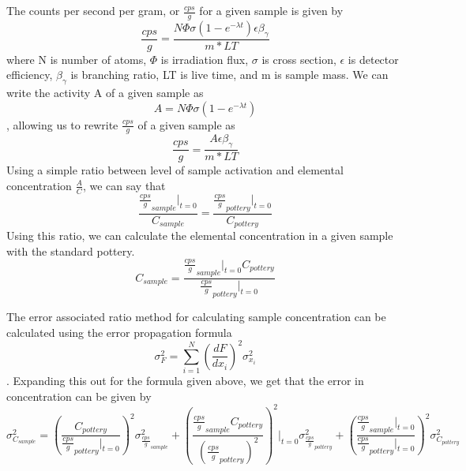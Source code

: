 \documentclass[]{article}
\begin{document}
The counts per second per gram, or $\frac{cps}{g}$ for a given sample is given by $$\frac{cps}{g} = \frac{N\Phi\sigma(1-e^{-\lambda t})\epsilon \beta_{ \gamma}}{m * LT}$$ where N is number of atoms, $\Phi$ is irradiation flux, $\sigma$ is cross section, $\epsilon$ is detector efficiency, $\beta_{\gamma}$ is branching ratio, LT is live time, and m is sample mass. We can write the activity A of a given sample as $$A=N\Phi\sigma(1-e^{-\lambda t})$$, allowing us to rewrite $\frac{cps}{g}$ of a given sample as $$\frac{cps}{g} = \frac{A\epsilon\beta_{\gamma}}{m*LT}$$ Using a simple ratio between level of sample activation and elemental concentration $\frac{A}{C}$, we can say that $$\frac{\frac{cps}{g}_{sample}|_{t=0}}{C_{sample}} = \frac{\frac{cps}{g}_{pottery}|_{t=0}}{C_{pottery}}$$ Using this ratio, we can calculate the elemental concentration in a given sample with the standard pottery. $$C_{sample} = \frac{\frac{cps}{g}_{sample}|_{t=0} C_{pottery}}{\frac{cps}{g}_{pottery}|_{t=0}}$$

The error associated ratio method for calculating sample concentration can be calculated using the error propagation formula $$\sigma_F^2 = \sum_{i=1}^N (\frac{dF}{dx_i})^2 \sigma_{x_i}^2$$. Expanding this out for the formula given above, we get that the error in concentration can be given by $$\sigma_{C_{sample}}^2 = (\frac{C_{pottery}}{\frac{cps}{g}_{pottery}|_{t=0}})^2\sigma_{\frac{cps}{g}_{sample}}^2 +  (\frac{\frac{cps}{g}_{sample} C_{pottery}}{(\frac{cps}{g}_{pottery})^2})^2|_{t=0}\sigma_{\frac{cps}{g}_{pottery}}^2 +  (\frac{\frac{cps}{g}_{sample}|_{t=0}}{\frac{cps}{g}_{pottery}|_{t=0}})^2\sigma_{C_{pottery}}^2$$
\end{document}
